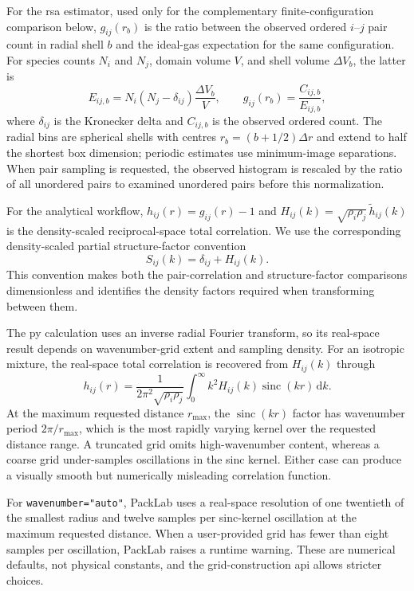 \documentclass[11pt]{article}
\begin{document}
For the \gls{rsa} estimator, used only for the complementary finite-configuration comparison below, $g_{ij}(r_b)$ is the ratio between the observed ordered $i$--$j$ pair count in radial shell $b$ and the ideal-gas expectation for the same configuration. %
For species counts $N_i$ and $N_j$, domain volume $V$, and shell volume $\Delta V_b$, the latter is
\begin{equation}
    E_{ij,b} = N_i\left(N_j-\delta_{ij}\right)\frac{\Delta V_b}{V},
    \qquad
    g_{ij}(r_b) = \frac{C_{ij,b}}{E_{ij,b}},
\end{equation}
where $\delta_{ij}$ is the Kronecker delta and $C_{ij,b}$ is the observed ordered count. %
The radial bins are spherical shells with centres $r_b=(b+1/2)\Delta r$ and extend to half the shortest box dimension; periodic estimates use minimum-image separations. %
When pair sampling is requested, the observed histogram is rescaled by the ratio of all unordered pairs to examined unordered pairs before this normalization. %

For the analytical workflow, $h_{ij}(r)=g_{ij}(r)-1$ and $H_{ij}(k)=\sqrt{\rho_i\rho_j}\,\tilde{h}_{ij}(k)$ is the density-scaled reciprocal-space total correlation. %
We use the corresponding density-scaled partial structure-factor convention
\begin{equation}
    S_{ij}(k)=\delta_{ij}+H_{ij}(k).
\end{equation}
This convention makes both the pair-correlation and structure-factor comparisons dimensionless and identifies the density factors required when transforming between them. %

The \gls{py} calculation uses an inverse radial Fourier transform, so its real-space result depends on wavenumber-grid extent and sampling density. %
For an isotropic mixture, the real-space total correlation is recovered from $H_{ij}(k)$ through
\begin{equation}
    h_{ij}(r) = \frac{1}{2\pi^2\sqrt{\rho_i\rho_j}}
    \int_0^\infty k^2 H_{ij}(k)\operatorname{sinc}(kr)\,\mathrm{d}k.
\end{equation}
At the maximum requested distance $r_{\max}$, the $\operatorname{sinc}(kr)$ factor has wavenumber period $2\pi/r_{\max}$, which is the most rapidly varying kernel over the requested distance range. %
A truncated grid omits high-wavenumber content, whereas a coarse grid under-samples oscillations in the sinc kernel. %
Either case can produce a visually smooth but numerically misleading correlation function. %

For \texttt{wavenumber="auto"}, PackLab uses a real-space resolution of one twentieth of the smallest radius and twelve samples per sinc-kernel oscillation at the maximum requested distance. %
When a user-provided grid has fewer than eight samples per oscillation, PackLab raises a runtime warning. %
These are numerical defaults, not physical constants, and the grid-construction \gls{api} allows stricter choices. %
\end{document}
